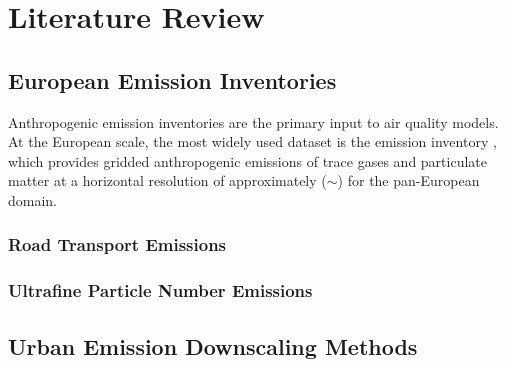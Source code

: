 
\chapter{Literature Review}
\label{ch:literature}


\section{European Emission Inventories}
\label{sec:lit_inventories}

Anthropogenic emission inventories are the primary input to air quality models.
At the European scale, the most widely used dataset is the \cams{} emission
inventory \citep{Kuenen2022}, which provides gridded anthropogenic emissions of
trace gases and particulate matter at a horizontal resolution of approximately
($\sim$)
 for the pan-European domain.


\subsection{Road Transport Emissions}
\label{sec:lit_road}


\subsection{Ultrafine Particle Number Emissions}
\label{sec:lit_ufp}


\section{Urban Emission Downscaling Methods}
\label{sec:lit_downscaling}

